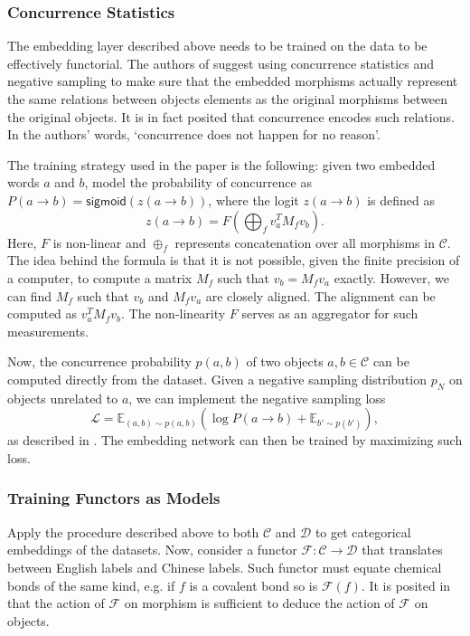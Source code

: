 \documentclass[11pt,a4paper,openright,twoside]{report}
\theoremstyle{plain}
\theoremstyle{definition}
\begin{document}
\subsubsection{Concurrence Statistics}

The embedding layer described above needs to be trained on the data to be effectively functorial. The authors of \cite{sheshmaniCategoricalRepresentationLearning2022} suggest using concurrence statistics and negative sampling to make sure that the embedded morphisms actually represent the same relations between objects elements as the original morphisms between the original objects. It is in fact posited that concurrence encodes such relations. In the authors' words, \lq  concurrence does not happen for no reason\rq.


The training strategy used in the paper is the following: given two embedded words $a$ and $b$, model the probability of concurrence as $P(a \to b) = \mathsf{sigmoid}(z(a \to b))$, where the logit $z(a \to b)$ is defined as
\[z(a \to b) = F\left(\bigoplus_f v_a^TM_fv_b \right).\]
Here, $F$ is non-linear and $\oplus_f$ represents concatenation over all morphisms in $\mathcal{C}$. The idea behind the formula is that it is not possible, given the finite precision of a computer, to compute a matrix $M_f$ such that $v_b = M_fv_a$ exactly. However, we can find $M_f$ such that $v_b$ and $M_fv_a$ are closely aligned. The alignment can be computed as $v_a^TM_fv_b$. The non-linearity $F$ serves as an aggregator for such measurements.


Now, the concurrence probability $p(a,b)$ of two objects $a,b \in \mathcal{C}$ can be computed directly from the dataset. Given a negative sampling distribution $p_N$ on objects unrelated to $a$, we can implement the negative sampling loss
\[\mathcal{L} = \mathbb{E}_{(a,b) \sim p(a,b)}\left(\log P(a \to b) + \mathbb{E}_{b' \sim p(b')}\right),\]
as described in \cite{sheshmaniCategoricalRepresentationLearning2022}. The embedding network can then be trained by maximizing such loss.


\subsubsection{Training Functors as Models}

Apply the procedure described above to both $\mathcal{C}$ and $\mathcal{D}$ to get categorical embeddings of the datasets. Now, consider a functor $\mathcal{F}: \mathcal{C} \to \mathcal{D}$ that translates between English labels and Chinese labels. Such functor must equate chemical bonds of the same kind, e.g. if $f$ is a covalent bond so is $\mathcal{F}(f)$. It is posited in \cite{sheshmaniCategoricalRepresentationLearning2022} that the action of $\mathcal{F}$ on morphism is sufficient to deduce the action of $\mathcal{F}$ on objects.
\end{document}
